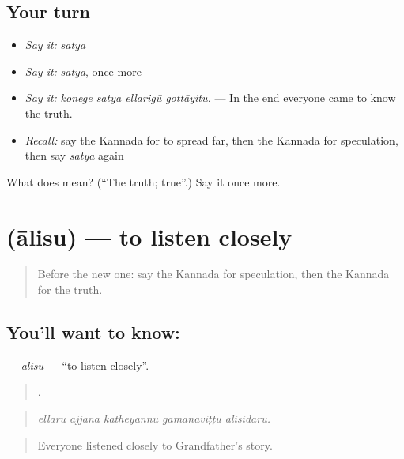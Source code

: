 \subsection*{Your turn}
\begin{itemize}
\raggedright
  \item \emph{Say it:} \emph{satya}
  \item \emph{Say it:} \emph{satya}, once more
  \item \emph{Say it:} \emph{konege satya ellarigū gottāyitu.} — In the end everyone came to know the truth.
  \item \emph{Recall:} say the Kannada for to spread far, then the Kannada for speculation, then say \emph{satya} again
\end{itemize}

\begin{tcolorbox}[breakable,colback=teal!4,colframe=teal!35!black,title={Before you move on}]
What does  mean? (\textquotedblleft{}The truth; true\textquotedblright{}.) Say it once more.
\end{tcolorbox}
\section[\texorpdfstring{\kn{ಆಲಿಸು} (ālisu)}{ಆಲಿಸು (ālisu)}]{ (ālisu) — to listen closely}

\label{lesson:KA-C338-alisu-listen}



\begin{quote}
Before the new one: say the Kannada for speculation, then the Kannada for the truth.
\end{quote}

\subsection*{You'll want to know: }
\textbf{} — \emph{ālisu} — \textquotedblleft{}to listen closely\textquotedblright{}.

\begin{quote}
    .
\end{quote}

\begin{quote}
\emph{ellarū ajjana katheyannu gamanaviṭṭu ālisidaru.}
\end{quote}

\begin{quote}
Everyone listened closely to Grandfather's story.
\end{quote}

